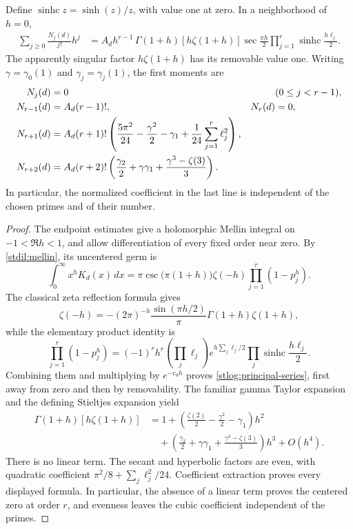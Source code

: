 \begin{theorem}
\label{stlog:principal-germ}
Define $\operatorname{sinhc}z=\sinh(z)/z$, with value one at zero.
In a neighborhood of $h=0$,
\begin{align}
 \sum_{j\ge0}\frac{N_j(d)}{j!}h^j
 &=A_dh^{r-1}\,\Gamma(1+h)[h\zeta(1+h)]
       \sec\frac{\pi h}{2}
       \prod_{j=1}^r\operatorname{sinhc}\frac{h\ell_j}{2}.
       \label{stlog:principal-series}
\end{align}
The apparently singular factor $h\zeta(1+h)$ has its removable value one.
Writing $\gamma=\gamma_0(1)$ and $\gamma_j=\gamma_j(1)$, the first moments are
\begin{align}
 N_j(d)&=0 &&(0\le j<r-1),\notag\\
 N_{r-1}(d)&=A_d(r-1)!,&
 N_r(d)&=0,\label{stlog:first-moments}\\
 N_{r+1}(d)&=A_d(r+1)!
  \left(\frac{5\pi^2}{24}-\frac{\gamma^2}{2}-\gamma_1
                 +\frac1{24}\sum_{j=1}^r\ell_j^2\right),\notag\\
 N_{r+2}(d)&=A_d(r+2)!
  \left(\frac{\gamma_2}{2}+\gamma\gamma_1
                          +\frac{\gamma^3-\zeta(3)}3\right).
                          \label{stlog:universal-cubic}
\end{align}
In particular, the normalized coefficient in the last line is independent
of the chosen primes and of their number.
\end{theorem}
\begin{proof}
The endpoint estimates give a holomorphic Mellin integral on
$-1<\Re h<1$, and allow differentiation of every fixed order near zero.
By \eqref{stdil:mellin}, its uncentered germ is
\[
 \int_0^\infty x^hK_d(x)\,dx
   =\pi\csc\bigl(\pi(1+h)\bigr)\zeta(-h)
                   \prod_{j=1}^r(1-p_j^h).
\]
The classical zeta reflection formula \cite{stchar:classical} gives
\[
 \zeta(-h)=-(2\pi)^{-h}\frac{\sin(\pi h/2)}{\pi}
                     \Gamma(1+h)\zeta(1+h),
\]
while the elementary product identity is
\[
 \prod_{j=1}^r(1-p_j^h)
   =(-1)^rh^r\left(\prod_j\ell_j\right)
       e^{h\sum_j\ell_j/2}
       \prod_j\operatorname{sinhc}\frac{h\ell_j}{2}.
\]
Combining them and multiplying by $e^{-c_dh}$ proves
\eqref{stlog:principal-series}, first away from zero and then by removability.
The familiar gamma Taylor expansion and the defining Stieltjes expansion yield
\begin{align*}
 \Gamma(1+h)[h\zeta(1+h)]
   &=1+\left(\frac{\zeta(2)}2-\frac{\gamma^2}2-\gamma_1\right)h^2\\
   &\quad+\left(\frac{\gamma_2}2+\gamma\gamma_1
                  +\frac{\gamma^3-\zeta(3)}3\right)h^3+O(h^4).
\end{align*}
There is no linear term. The secant and hyperbolic factors are even,
with quadratic coefficient $\pi^2/8+\sum_j\ell_j^2/24$.
Coefficient extraction proves every displayed formula. In particular,
the absence of a linear term proves the centered zero at order $r$,
and evenness leaves the cubic coefficient independent of the primes.
\end{proof}


